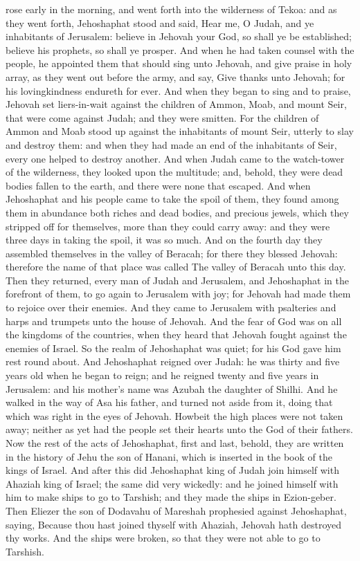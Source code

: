 rose early in the morning, and went forth into the wilderness of Tekoa: and as they went forth, Jehoshaphat stood and said, Hear me, O Judah, and ye inhabitants of Jerusalem: believe in Jehovah your God, so shall ye be established; believe his prophets, so shall ye prosper. And when he had taken counsel with the people, he appointed them that should sing unto Jehovah, and give praise in holy array, as they went out before the army, and say, Give thanks unto Jehovah; for his lovingkindness endureth for ever. And when they began to sing and to praise, Jehovah set liers-in-wait against the children of Ammon, Moab, and mount Seir, that were come against Judah; and they were smitten. For the children of Ammon and Moab stood up against the inhabitants of mount Seir, utterly to slay and destroy them: and when they had made an end of the inhabitants of Seir, every one helped to destroy another.  And when Judah came to the watch-tower of the wilderness, they looked upon the multitude; and, behold, they were dead bodies fallen to the earth, and there were none that escaped. And when Jehoshaphat and his people came to take the spoil of them, they found among them in abundance both riches and dead bodies, and precious jewels, which they stripped off for themselves, more than they could carry away: and they were three days in taking the spoil, it was so much. And on the fourth day they assembled themselves in the valley of Beracah; for there they blessed Jehovah: therefore the name of that place was called The valley of Beracah unto this day. Then they returned, every man of Judah and Jerusalem, and Jehoshaphat in the forefront of them, to go again to Jerusalem with joy; for Jehovah had made them to rejoice over their enemies. And they came to Jerusalem with psalteries and harps and trumpets unto the house of Jehovah. And the fear of God was on all the kingdoms of the countries, when they heard that Jehovah fought against the enemies of Israel. So the realm of Jehoshaphat was quiet; for his God gave him rest round about.  And Jehoshaphat reigned over Judah: he was thirty and five years old when he began to reign; and he reigned twenty and five years in Jerusalem: and his mother’s name was Azubah the daughter of Shilhi. And he walked in the way of Asa his father, and turned not aside from it, doing that which was right in the eyes of Jehovah. Howbeit the high places were not taken away; neither as yet had the people set their hearts unto the God of their fathers. Now the rest of the acts of Jehoshaphat, first and last, behold, they are written in the history of Jehu the son of Hanani, which is inserted in the book of the kings of Israel.  And after this did Jehoshaphat king of Judah join himself with Ahaziah king of Israel; the same did very wickedly: and he joined himself with him to make ships to go to Tarshish; and they made the ships in Ezion-geber. Then Eliezer the son of Dodavahu of Mareshah prophesied against Jehoshaphat, saying, Because thou hast joined thyself with Ahaziah, Jehovah hath destroyed thy works. And the ships were broken, so that they were not able to go to Tarshish. 

